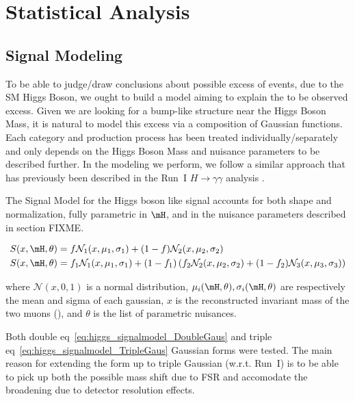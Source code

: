 \section{Statistical Analysis} \label{section:higgs_analysis}

\subsection{Signal Modeling} \label{subsection:higgs_analysis_signal}
%
%

%
%
To be able to judge/draw conclusions about possible excess of events, due to the SM Higgs Boson, we ought to build a model aiming to explain the to be observed excess. Given we are looking for a bump-like structure near the Higgs Boson Mass, it is natural to model this excess via a composition of Gaussian functions. Each category and production process has been treated individually/separately and only depends on the Higgs Boson Mass and nuisance parameters to be described further. In the modeling we perform, we follow a similar approach that has previously been described in the Run~I $H\rightarrow\gamma\gamma$ analysis \cite{CMS-PAS-HIG-13-001,CMS_AN_2013-253}.

The Signal Model for the Higgs boson like signal accounts for both shape and normalization, fully parametric in $\mH$, and in the nuisance parameters described in section FIXME. %

\begin{align}
   \label{eq:higgs_signalmodel_DoubleGaus}
   S(x,\mH, \theta) &= f \mathcal{N}_{1}(x, \mu_{1}, \sigma_{1}) + (1-f)  \mathcal{N}_{2}(x, \mu_{2}, \sigma_{2}) \\
   \label{eq:higgs_signalmodel_TripleGaus}
   S(x,\mH, \theta) &= f_{1} \mathcal{N}_{1}(x, \mu_{1}, \sigma_{1}) + (1-f_{1}) \left(f_{2} \mathcal{N}_{2}(x, \mu_{2}, \sigma_{2}) + (1-f_{2}) \mathcal{N}_{3}(x, \mu_{3}, \sigma_{3})\right)
\end{align}

where $\mathcal{N}(x,0,1)$ is a normal distribution, $\mu_i(\mH,\theta), \sigma_i(\mH,\theta)$ are respectively the mean and sigma of each gaussian, $x$ is the reconstructed invariant mass of the two muons (\mmm), and $\theta$ is the list of parametric nuisances.

%
%
Both double eq~\ref{eq:higgs_signalmodel_DoubleGaus} and triple eq~\ref{eq:higgs_signalmodel_TripleGaus} Gaussian forms were tested.
The main reason for extending the form up to triple Gaussian (w.r.t. Run~I)
is to be able to pick up both the possible mass shift due to FSR and accomodate the broadening due to detector resolution effects.

